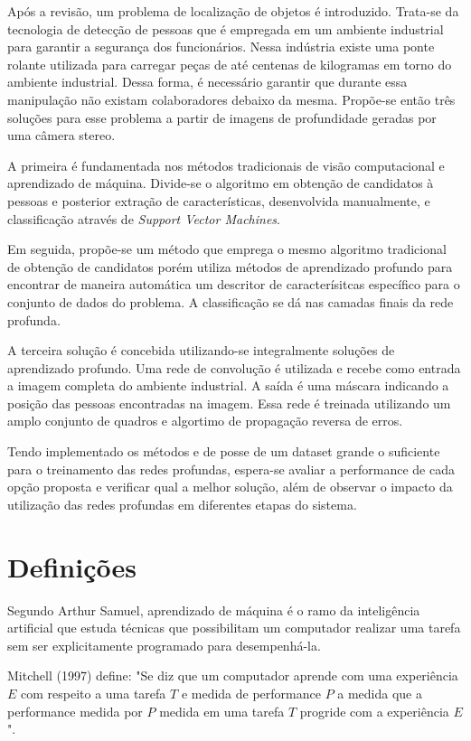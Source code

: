 Após a revisão, um problema de localização de objetos é introduzido. Trata-se da tecnologia de detecção de pessoas que é empregada em um ambiente industrial para garantir a segurança dos funcionários. Nessa indústria existe uma ponte rolante utilizada para carregar peças de até centenas de kilogramas em torno do ambiente industrial. Dessa forma, é necessário garantir que durante essa manipulação não existam colaboradores debaixo da mesma. Propõe-se então três soluções para esse problema a partir de imagens de profundidade geradas por uma câmera stereo.

A primeira é fundamentada nos métodos tradicionais de visão computacional e aprendizado de máquina. Divide-se o algoritmo em obtenção de candidatos à pessoas e posterior extração de características, desenvolvida manualmente, e classificação através de \textit{Support Vector Machines}.

Em seguida, propõe-se um método que emprega o mesmo algoritmo tradicional de obtenção de candidatos porém utiliza métodos de aprendizado profundo para encontrar de maneira automática um descritor de caracterísitcas específico para o conjunto de dados do problema. A classificação se dá nas camadas finais da rede profunda.

A terceira solução é concebida utilizando-se integralmente soluções de aprendizado profundo. Uma rede de convolução é utilizada e recebe como entrada a imagem completa do ambiente industrial. A saída é uma máscara indicando a posição das pessoas encontradas na imagem. Essa rede é treinada utilizando um amplo conjunto de quadros e algortimo de propagação reversa de erros.

Tendo implementado os métodos e de posse de um dataset grande o suficiente para o treinamento das redes profundas, espera-se avaliar a performance de cada opção proposta e verificar qual a melhor solução, além de observar o impacto da utilização das redes profundas em diferentes etapas do sistema.

\section{Definições}
Segundo Arthur Samuel, aprendizado de máquina é o ramo da inteligência artificial que estuda técnicas que possibilitam um computador realizar uma tarefa sem ser explicitamente programado para desempenhá-la. 

Mitchell (1997) define: "Se diz que um computador aprende com uma experiência $E$ com respeito a uma tarefa $T$ e medida de performance $P$ a medida que a performance medida por $P$ medida em uma tarefa $T$ progride com a experiência $E$". 

